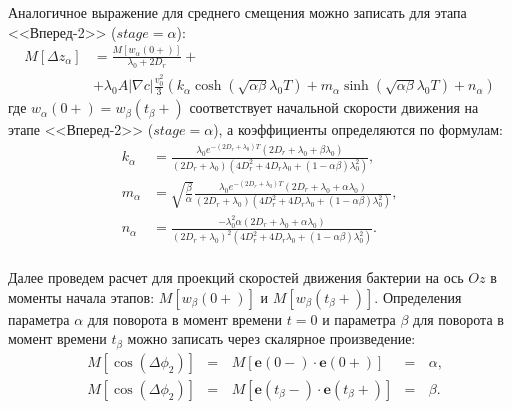 Аналогичное выражение для среднего смещения можно записать для этапа <<Вперед-2>> ($stage=\alpha$):
\begin{equation}
    \begin{aligned}
        M[\Delta z_{\alpha}]&=\frac{M[w_{\alpha}(0+)]}{\lambda_0+2 D_r} +\\ &+ \lambda_0 A |\nabla c| \frac{v_0^2}{3} \left ( k_{\alpha} \cosh \left (\sqrt{\alpha \beta} \lambda_0 T \right ) + m_{\alpha} \sinh \left (\sqrt{\alpha \beta} \lambda_0 T \right ) + n_{\alpha} \right )
        \label{eq:mdlrd-solution-alpha}
    \end{aligned}
\end{equation}
где $w_{\alpha}(0+)=w_{\beta}(t_{\beta}+)$ соответствует начальной скорости движения на этапе <<Вперед-2>> ($stage=\alpha$), а коэффициенты определяются по формулам:
\begin{equation}
    \begin{aligned}
        k_{\alpha}&=\frac{\lambda_0 e^{-(2D_r+\lambda_0)T} \left (2D_r+\lambda_0+\beta\lambda_0 \right )}{(2D_r+\lambda_0) \left (4D_r^2+4D_r\lambda_0+(1-\alpha\beta)\lambda_0^2 \right )}, \\
        m_{\alpha}&=\sqrt{\frac{\beta}{\alpha}}\frac{\lambda_0 e^{-(2D_r+\lambda_0)T} \left (2D_r+\lambda_0+\alpha\lambda_0 \right )}{(2D_r+\lambda_0) \left (4D_r^2+4D_r\lambda_0+(1-\alpha\beta)\lambda_0^2 \right )}, \\
        n_{\alpha}&=\frac{-\lambda_0^2 \alpha (2D_r+\lambda_0+\alpha\lambda_0)}{(2D_r+\lambda_0)^2 \left (4D_r^2+4D_r\lambda_0+(1-\alpha\beta)\lambda_0^2 \right )}. \\
        \label{eq:mdlrd-solution-alpha-coeffs}
    \end{aligned}
\end{equation}

Далее проведем расчет для проекций скоростей движения бактерии на ось $Oz$ в моменты начала этапов: $M[w_{\beta}(0+)]$ и $M[w_{\beta}(t_{\beta}+)]$. Определения параметра $\alpha$ для поворота в момент времени $t=0$ и параметра $\beta$ для поворота в момент времени $t_{\beta}$ можно записать через скалярное произведение:
\begin{equation}
    \begin{aligned}
        &M \left [\cos (\Delta\phi_2) \right ]&=&\,M[\textbf{e}(0-) \cdot \textbf{e}(0+)]&=&\,\alpha, \\
        &M[\cos (\Delta\phi_2)]&=&\,M[\textbf{e}(t_{\beta}-) \cdot \textbf{e}(t_{\beta}+)]&=&\,\beta. \\
        \label{eq:alpha-beta-definition}
    \end{aligned}
\end{equation}


